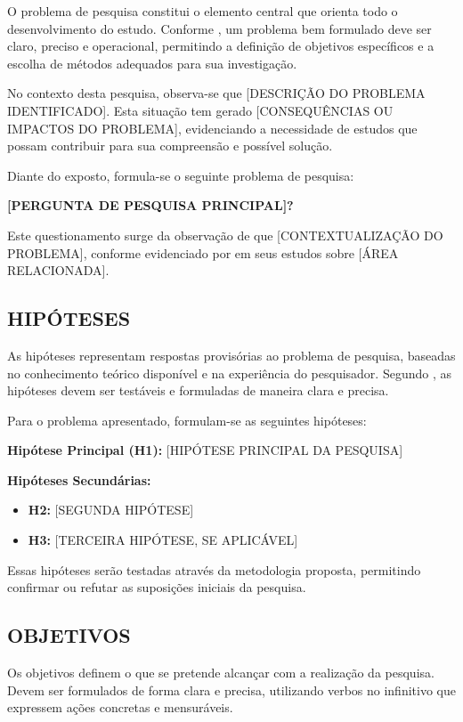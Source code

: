 \documentclass[
    12pt,        %
    openany,     %
    oneside,     %
    a4paper,     %
    english,     %
    french,      %
    spanish,     %
    brazil,      %
    article      %
]{abntex2}
\begin{document}
O problema de pesquisa constitui o elemento central que orienta todo o desenvolvimento do estudo. Conforme , um problema bem formulado deve ser claro, preciso e operacional, permitindo a definição de objetivos específicos e a escolha de métodos adequados para sua investigação.

No contexto desta pesquisa, observa-se que [DESCRIÇÃO DO PROBLEMA IDENTIFICADO]. Esta situação tem gerado [CONSEQUÊNCIAS OU IMPACTOS DO PROBLEMA], evidenciando a necessidade de estudos que possam contribuir para sua compreensão e possível solução.

Diante do exposto, formula-se o seguinte problema de pesquisa:

\textbf{[PERGUNTA DE PESQUISA PRINCIPAL]?}

Este questionamento surge da observação de que [CONTEXTUALIZAÇÃO DO PROBLEMA], conforme evidenciado por  em seus estudos sobre [ÁREA RELACIONADA].


\subsection{HIPÓTESES}
\label{subsec:hipoteses}   

As hipóteses representam respostas provisórias ao problema de pesquisa, baseadas no conhecimento teórico disponível e na experiência do pesquisador. Segundo , as hipóteses devem ser testáveis e formuladas de maneira clara e precisa.

Para o problema apresentado, formulam-se as seguintes hipóteses:

\textbf{Hipótese Principal (H1):} [HIPÓTESE PRINCIPAL DA PESQUISA]

\textbf{Hipóteses Secundárias:}
\begin{itemize}
    \item \textbf{H2:} [SEGUNDA HIPÓTESE]
    \item \textbf{H3:} [TERCEIRA HIPÓTESE, SE APLICÁVEL]
\end{itemize}

Essas hipóteses serão testadas através da metodologia proposta, permitindo confirmar ou refutar as suposições iniciais da pesquisa.


\subsection{OBJETIVOS}
\label{subsec:objetivos}

Os objetivos definem o que se pretende alcançar com a realização da pesquisa. Devem ser formulados de forma clara e precisa, utilizando verbos no infinitivo que expressem ações concretas e mensuráveis.
\end{document}
